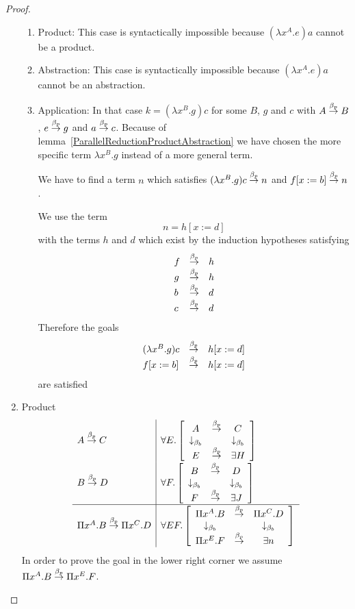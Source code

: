 \begin{theorem}
\begin{proof}
\begin{enumerate}
\begin{enumerate}
            \item Product: This case is syntactically impossible because
            $(\lambda x^A.e) a$ cannot be a product.


            \item Abstraction: This case is syntactically impossible because
            $(\lambda x^A.e) a$ cannot be an abstraction.


            \item Application: In that case $k = (\lambda x^B. g) c$ for some
            $B$, $g$ and $c$ with $A \stackrel{\beta_p}{\to} B$, $e \stackrel{\beta_p}{\to} g$ and $a \stackrel{\beta_p}{\to}
            c$. Because of lemma~\ref{ParallelReductionProductAbstraction} we
            have chosen the more specific term $\lambda x^B. g$ instead of a
            more general term.

            We have to find a term $n$ which satisfies $(\lambda x^B. g) c
            \stackrel{\beta_p}{\to} n$ and $f[x:=b] \stackrel{\beta_p}{\to} n$.

            We use the term
            $$
                n = h[x:=d]
            $$
            with the terms $h$ and $d$ which exist by the induction hypotheses
            satisfying
            $$
            \begin{array}{lll}
                f &\stackrel{\beta_p}{\to}& h
                \\
                g &\stackrel{\beta_p}{\to}& h
                \\
                b &\stackrel{\beta_p}{\to}& d
                \\
                c &\stackrel{\beta_p}{\to}& d
            \end{array}
            $$
            Therefore the goals
            $$
            \begin{array}{lll}
                (\lambda x^B.g) c &\stackrel{\beta_p}{\to}& h[x:=d]
                \\
                f[x:=b] &\stackrel{\beta_p}{\to}& h[x:=d]
            \end{array}
            $$
            are satisfied
            \end{enumerate}


        \item Product
        $$
        \begin{array}{l|l}
            A \stackrel{\beta_p}{\to} C
            &
            \forall E. \left[ \begin{array}{ccc} A & \stackrel{\beta_p}{\to} & C \\ \downarrow_{\beta_b} & & \downarrow_{\beta_b} \\ E & \stackrel{\beta_p}{\to} & \exists H \end{array} \right]
            \\
            B \stackrel{\beta_p}{\to} D
            &
            \forall F. \left[ \begin{array}{ccc} B & \stackrel{\beta_p}{\to} & D \\ \downarrow_{\beta_b} & & \downarrow_{\beta_b} \\ F & \stackrel{\beta_p}{\to} & \exists J \end{array} \right]
            \\
            \hline
            \Pi x^A. B \stackrel{\beta_p}{\to} \Pi x^C. D
            &
            \forall EF. \left[ \begin{array}{ccc} \Pi x^A.B & \stackrel{\beta_p}{\to} & \Pi x^C.D \\ \downarrow_{\beta_b} & & \downarrow_{\beta_b} \\ \Pi x^E.F & \stackrel{\beta_p}{\to} & \exists n \end{array} \right]
        \end{array}
        $$
        In order to prove the goal in the lower right corner we assume $\Pi x^A.
        B \stackrel{\beta_p}{\to} \Pi x^E.F$.


\end{enumerate}
\end{proof}
\end{theorem}
